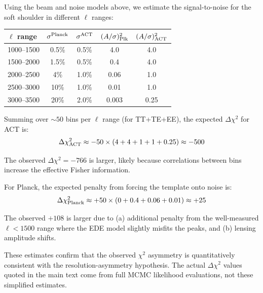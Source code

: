 \documentclass[twocolumn,showpacs,preprintnumbers,amsmath,amssymb,prd]{revtex4-2}
\begin{document}
Using the beam and noise models above, we estimate the signal-to-noise for 
the soft shoulder in different $\ell$ ranges:

\begin{center}
\begin{tabular}{lcccc}
\toprule
$\ell$ range & $\sigma^{\rm Planck}$ & $\sigma^{\rm ACT}$ & $(A/\sigma)^2_{\rm Plk}$ & $(A/\sigma)^2_{\rm ACT}$ \\
\midrule
1000--1500 & 0.5\% & 0.5\% & 4.0 & 4.0 \\
1500--2000 & 1.5\% & 0.5\% & 0.4 & 4.0 \\
2000--2500 & 4\% & 1.0\% & 0.06 & 1.0 \\
2500--3000 & 10\% & 1.0\% & 0.01 & 1.0 \\
3000--3500 & 20\% & 2.0\% & 0.003 & 0.25 \\
\bottomrule
\end{tabular}
\end{center}

Summing over $\sim 50$ bins per $\ell$ range (for TT+TE+EE), the expected 
$\Delta\chi^2$ for ACT is:
\begin{equation}
\Delta\chi^2_{\rm ACT} \approx -50 \times (4 + 4 + 1 + 1 + 0.25) \approx -500
\end{equation}

The observed $\Delta\chi^2 = -766$ is larger, likely because correlations 
between bins increase the effective Fisher information.

For Planck, the expected penalty from forcing the template onto noise is:
\begin{equation}
\Delta\chi^2_{\rm Planck} \approx +50 \times (0 + 0.4 + 0.06 + 0.01) \approx +25
\end{equation}

The observed $+108$ is larger due to (a) additional penalty from the 
well-measured $\ell < 1500$ range where the EDE model slightly misfits 
the peaks, and (b) lensing amplitude shifts.

These estimates confirm that the observed $\chi^2$ asymmetry is quantitatively 
consistent with the resolution-asymmetry hypothesis. The actual $\Delta\chi^2$ 
values quoted in the main text come from full MCMC likelihood evaluations, 
not these simplified estimates.
\end{document}
